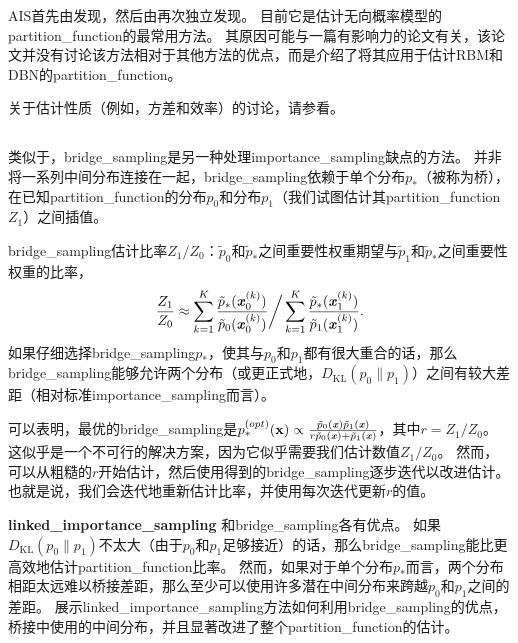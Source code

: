 
\gls{AIS}首先由\cite{Jarzynski1997}发现，然后由\cite{Neal-2001}再次独立发现。
目前它是估计无向概率模型的\gls{partition_function}的最常用方法。
其原因可能与一篇有影响力的论文\citep{Salakhutdinov+Murray-2008}有关，该论文并没有讨论该方法相对于其他方法的优点，而是介绍了将其应用于估计\gls{RBM}和\gls{DBN}的\gls{partition_function}。


关于估计性质（例如，方差和效率）的讨论，请参看\cite{Neal-2001}。


\subsection{}
\label{sec:bridge_sampling}
类似于，\gls{bridge_sampling}\citep{Bennet76}是另一种处理\gls{importance_sampling}缺点的方法。
并非将一系列中间分布连接在一起，\gls{bridge_sampling}依赖于单个分布$p_*$（被称为桥），在已知\gls{partition_function}的分布$p_0$和分布$p_1$（我们试图估计其\gls{partition_function}$Z_1$）之间插值。


\gls{bridge_sampling}估计比率$Z_1 / Z_0$：$\tilde{p}_0$和$\tilde{p}_*$之间重要性权重期望与$\tilde{p}_1$和$\tilde{p}_*$之间重要性权重的比率，
\begin{equation}
	\frac{Z_1}{ Z_0} \approx \sum_{k=1}^K \frac{ \tilde{p}_*(\boldsymbol{\mathit{x}}_0^{(k)}) }{ \tilde{p}_0(\boldsymbol{\mathit{x}}_0^{(k)}) } \bigg/ \sum_{k=1}^K \frac{ \tilde{p}_*(\boldsymbol{\mathit{x}}_1^{(k)}) }{ \tilde{p}_1(\boldsymbol{\mathit{x}}_1^{(k)}) } .
\end{equation}
如果仔细选择\gls{bridge_sampling}$p_*$，使其与$p_0$和$p_1$都有很大重合的话，那么\gls{bridge_sampling}能够允许两个分布（或更正式地，$D_{\text{KL}}(p_0 \| p_1)$）之间有较大差距（相对标准\gls{importance_sampling}而言）。


可以表明，最优的\gls{bridge_sampling}是$p_*^{(opt)} (\mathbf{x}) \propto \frac{ \tilde{p}_0(\boldsymbol{\mathit{x}}) \tilde{p}_1(\boldsymbol{\mathit{x}}) }{ r\tilde{p}_0(\boldsymbol{\mathit{x}}) + \tilde{p}_1(\boldsymbol{\mathit{x}}) }$，其中$r = Z_1 / Z_0$。
这似乎是一个不可行的解决方案，因为它似乎需要我们估计数值$Z_1 / Z_0$。
然而，可以从粗糙的$r$开始估计，然后使用得到的\gls{bridge_sampling}逐步迭代以改进估计\citep{Neal05estimatingratios}。
也就是说，我们会迭代地重新估计比率，并使用每次迭代更新$r$的值。


\textbf{\gls{linked_importance_sampling}}
和\gls{bridge_sampling}各有优点。
如果$D_{\text{KL}}(p_0 \| p_1)$不太大（由于$p_0$和$p_1$足够接近）的话，那么\gls{bridge_sampling}能比更高效地估计\gls{partition_function}比率。
然而，如果对于单个分布$p_*$而言，两个分布相距太远难以桥接差距，那么至少可以使用许多潜在中间分布来跨越$p_0$和$p_1$之间的差距。
\cite{Neal05estimatingratios}展示\gls{linked_importance_sampling}方法如何利用\gls{bridge_sampling}的优点，桥接中使用的中间分布，并且显著改进了整个\gls{partition_function}的估计。


